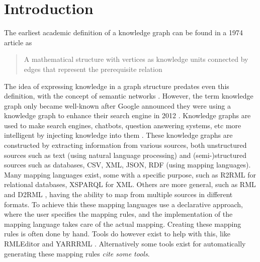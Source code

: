 
\chapter{Introduction}
\label{chapter:introduction}


The earliest academic definition of a knowledge graph can be found in a 1974 article as \begin{quote}
    A mathematical structure with vertices as knowledge units connected by edges that represent the prerequisite relation \citep{Marchi1974,bergman2019common}
\end{quote} 

The idea of expressing knowledge in a graph structure predates even this definition, with the concept of semantic networks \citep{Richens1956PreprogrammingFM}. %
However, the term knowledge graph only became well-known after Google announced they were using a knowledge graph to enhance their search engine in 2012 \citep{singhal2012introducing}. 
Knowledge graphs are used to make search engines, chatbots, question answering systems, etc more intelligent by injecting knowledge into them \citep{SurveyOnKGs}. 
These knowledge graphs are constructed by extracting information from various sources, both unstructured sources such as text (using natural language processing) and (semi-)structured sources such as databases, CSV, XML, JSON, RDF (using mapping languages). Many mapping languages exist, some with a specific purpose, such as R2RML \citep{Das:12:RRR} for relational databases, XSPARQL \citep{Bischof2012} for XML. Others are more general, such as RML \citep{dimou_ldow_2014} and D2RML \citep{Chortaras2018D2RMLIH}, having the ability to map from multiple sources in different formats. 
To achieve this these mapping languages use a declarative approach, where the user specifies the mapping rules, and the implementation of the mapping language takes care of the actual mapping. Creating these mapping rules is often done by hand. Tools do however exist to help with this, like RMLEditor \citep{heyvaert_jws_2018} and YARRRML \citep{10.1007/978-3-319-98192-5_40}. Alternatively some tools exist for automatically generating these mapping rules \textit{cite some tools}.

